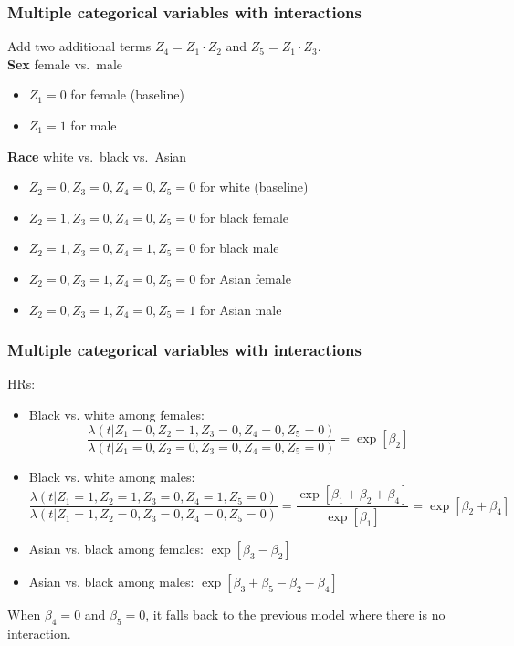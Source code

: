\documentclass[11pt, aspectratio = 169]{beamer}
\begin{document}
\begin{frame}
  \frametitle{Multiple categorical variables with interactions}
  Add two additional terms $Z_4 = Z_1 \cdot Z_2$ and $Z_5 = Z_1 \cdot Z_3$. \\
  \textbf{Sex} female vs.\ male
  \begin{itemize}
    \item $Z_1 = 0$ for female (baseline)
    \item $Z_1 = 1$ for male
  \end{itemize}
  \textbf{Race} white vs.\ black vs.\ Asian
  \begin{itemize}
    \item $Z_2 = 0, Z_3 = 0, Z_4 = 0, Z_5 = 0$ for white (baseline)
    \item $Z_2 = 1, Z_3 = 0, Z_4 = 0, Z_5 = 0$ for black female
    \item $Z_2 = 1, Z_3 = 0, Z_4 = 1, Z_5 = 0$ for black male
    \item $Z_2 = 0, Z_3 = 1, Z_4 = 0, Z_5 = 0$ for Asian female
    \item $Z_2 = 0, Z_3 = 1, Z_4 = 0, Z_5 = 1$ for Asian male
  \end{itemize}
\end{frame}

\begin{frame}
  \frametitle{Multiple categorical variables with interactions}
  HRs:
  \begin{itemize}
    \item Black vs. white among females:
    \begin{equation*}
      \frac{\lambda(t|Z_1 = 0, Z_2 = 1, Z_3 = 0, Z_4 = 0, Z_5 = 0)}{\lambda(t|Z_1 = 0, Z_2 = 0, Z_3 = 0, Z_4 = 0, Z_5 = 0)} = \exp\left[\beta_2\right]
    \end{equation*}
    \item Black vs. white among males:
    \begin{equation*}
      \frac{\lambda(t|Z_1 = 1, Z_2 = 1, Z_3 = 0, Z_4 = 1, Z_5 = 0)}{\lambda(t|Z_1 = 1, Z_2 = 0, Z_3 = 0, Z_4 = 0, Z_5 = 0)} = \frac{\exp\left[\beta_1 + \beta_2 + \beta_4\right]}{\exp\left[\beta_1\right]} = \exp\left[\beta_2 + \beta_4\right]
    \end{equation*}
    \item Asian vs. black among females: $\exp\left[\beta_3 - \beta_2\right]$
    \item Asian vs. black among males: $\exp\left[\beta_3 + \beta_5 - \beta_2 - \beta_4\right]$
  \end{itemize}
  When $\beta_4 = 0$ and $\beta_5 = 0$, it falls back to the previous model where there is no interaction.
\end{frame}
\end{document}
